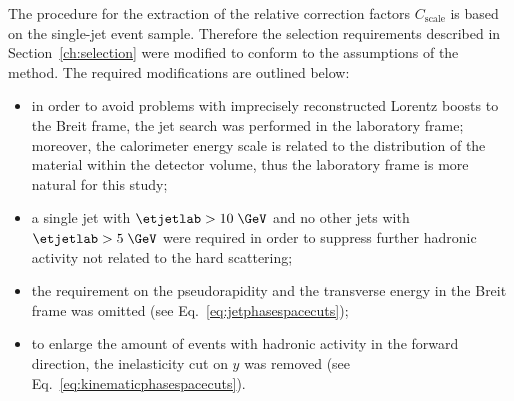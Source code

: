 The procedure for the extraction of the relative correction factors $C_\text{scale}$ is based on the single-jet event sample. Therefore the selection requirements described in Section~\ref{ch:selection} were modified to conform to the assumptions of the method. The required modifications are outlined below: 
\begin{itemize}
	\item in order to avoid problems with imprecisely reconstructed Lorentz boosts to the Breit frame, the jet search was performed in the laboratory frame; moreover, the calorimeter energy scale is related to the distribution of the material within the detector volume, thus the laboratory frame is more natural for this study;
	\item a single jet with $\etjetlab > 10\; \GeV$ and no other jets with $\etjetlab > 5\; \GeV$ were required in order to suppress further hadronic activity not related to the hard scattering;
	\item the requirement on the pseudorapidity and the transverse energy in the Breit frame was omitted (see Eq.~\eqref{eq:jetphasespacecuts});
	\item to enlarge the amount of events with hadronic activity in the forward direction, the inelasticity cut on $y$ was removed  (see Eq.~\eqref{eq:kinematicphasespacecuts}).
\end{itemize}

